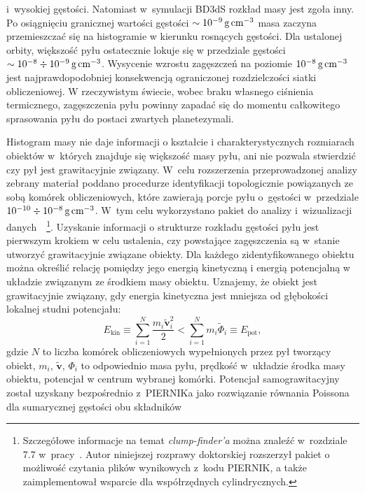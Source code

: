 i~wysokiej gęstości.  Natomiast w~symulacji BD3dS rozkład masy jest zgoła inny.
Po osiągnięciu granicznej wartości gęstości $\sim10^{-9}\hbox{$\thinspace\textrm{g}$}\hbox{$\thinspace\textrm{cm}$}^{-3}$ masa zaczyna
przemieszczać się na histogramie w kierunku rosnących gęstości. Dla ustalonej
orbity, większość pyłu ostatecznie lokuje się w przedziale gęstości
$\sim10^{-8}\div10^{-9}\hbox{$\thinspace\textrm{g}$}\hbox{$\thinspace\textrm{cm}$}^{-3}$.  Wysycenie wzrostu zagęszczeń na poziomie
$10^{-8}\hbox{$\thinspace\textrm{g}$}\hbox{$\thinspace\textrm{cm}$}^{-3}$ jest najprawdopodobniej konsekwencją
ograniczonej rozdzielczości siatki obliczeniowej. W rzeczywistym świecie, wobec
braku własnego ciśnienia termicznego, zagęszczenia pyłu powinny zapadać się do
momentu całkowitego sprasowania pyłu do postaci zwartych planetezymali.
\par Histogram masy nie daje informacji o kształcie i
charakterystycznych rozmiarach obiektów w~których znajduje się większość masy pyłu,
ani nie pozwala stwierdzić czy pył jest grawitacyjnie związany. W~celu
rozszerzenia przeprowadzonej analizy zebrany materiał poddano procedurze
identyfikacji topologicznie powiązanych ze sobą komórek obliczeniowych, które
zawierają porcje pyłu o~gęstości w~przedziale $10^{-10}\div10^{-8}\hbox{$\thinspace\textrm{g}$}\hbox{$\thinspace\textrm{cm}$}^{-3}$. W~tym
celu wykorzystano pakiet do analizy i~wizualizacji
danych~\yt{}~\footnote{Szczegółowe informacje na temat \emph{clump-finder'a}
można znaleźć w~rozdziale 7.7 w~pracy~\cite{yt}. Autor niniejszej rozprawy
doktorskiej rozszerzył pakiet \yt{} o możliwość czytania plików wynikowych z~kodu
PIERNIK, a także zaimplementował wsparcie dla współrzędnych cylindrycznych.}.
Uzyskanie informacji o strukturze rozkładu gęstości pyłu jest pierwszym krokiem w
celu ustalenia, czy powstające zagęszczenia są w~stanie utworzyć grawitacyjnie
związane obiekty. Dla każdego zidentyfikowanego obiektu można
określić relację pomiędzy jego energią kinetyczną i energią potencjalną
w układzie związanym ze środkiem masy obiektu. Uznajemy, że obiekt jest
grawitacyjnie związany, gdy energia kinetyczna jest mniejsza od głębokości
lokalnej studni potencjału:
%
\begin{equation}
   \label{eq:bcrit}
   E_{\textrm{kin}} \equiv \sum\limits_{i=1}^N \frac{m_i\tilde{\mathbf{v}}_i^2}{2} 
   < \sum\limits_{i=1}^N m_i\tilde{\Phi}_i \equiv E_{\textrm{pot}},
\end{equation}
%
gdzie $N$ to liczba komórek obliczeniowych wypełnionych przez pył tworzący
obiekt, $m_i$, $\tilde{\mathbf{v}}$, $\Phi_i$ to odpowiednio masa pyłu, prędkość
w~układzie środka masy obiektu, potencjał w centrum wybranej komórki. Potencjał
samograwitacyjny został uzyskany bezpośrednio z~PIERNIKa jako rozwiązanie
równania Poissona~ dla sumarycznej gęstości obu składników
